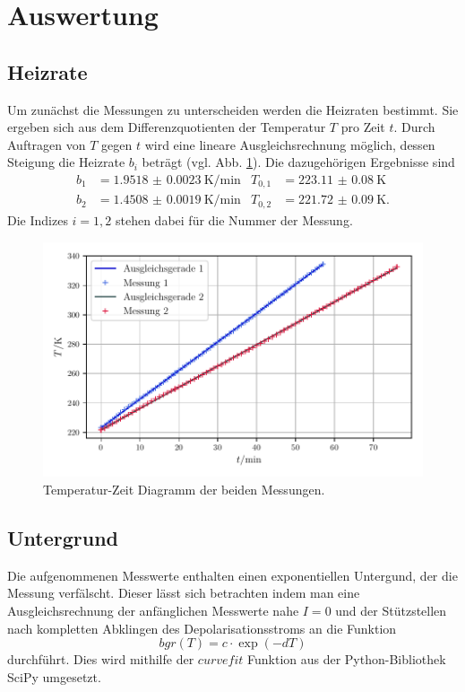 \section{Auswertung}
\label{sec:Auswertung}

\subsection{Heizrate}

Um zunächst die Messungen zu unterscheiden werden die Heizraten bestimmt. Sie ergeben sich aus dem Differenzquotienten der Temperatur $T$ pro Zeit $t$.
Durch Auftragen von $T$ gegen $t$ wird eine lineare Ausgleichsrechnung möglich, dessen Steigung die Heizrate $b_i$ beträgt (vgl. Abb. \ref{fig:heiz}).
Die dazugehörigen Ergebnisse sind
\begin{align}
    b_1 &= \qty{1.9518(23)}{\kelvin\per\minute} & T_{0,1} &= \qty{223.11(8)}{\kelvin} \\
    b_2 &= \qty{1.4508(19)}{\kelvin\per\minute} & T_{0,2} &= \qty{221.72(9)}{\kelvin}.
\end{align}
Die Indizes $i = 1,2$ stehen dabei für die Nummer der Messung.

\begin{figure}
    \centering
    \includegraphics[width=0.8\linewidth]{scripts/build/Heizrate.pdf}
    \caption{Temperatur-Zeit Diagramm der beiden Messungen.}
    \label{fig:heiz}
\end{figure}

\subsection{Untergrund}
Die aufgenommenen Messwerte enthalten einen exponentiellen Untergund, der die Messung verfälscht.
Dieser lässt sich betrachten indem man eine Ausgleichsrechnung der anfänglichen Messwerte nahe $I=0$ und der Stützstellen nach kompletten Abklingen des Depolarisationsstroms
an die Funktion
\begin{equation}
    bgr(T) = c \cdot \exp(-dT)
\end{equation}
durchführt. Dies wird mithilfe der $curve fit$ Funktion aus der Python-Bibliothek SciPy\cite{scipy} umgesetzt. 


